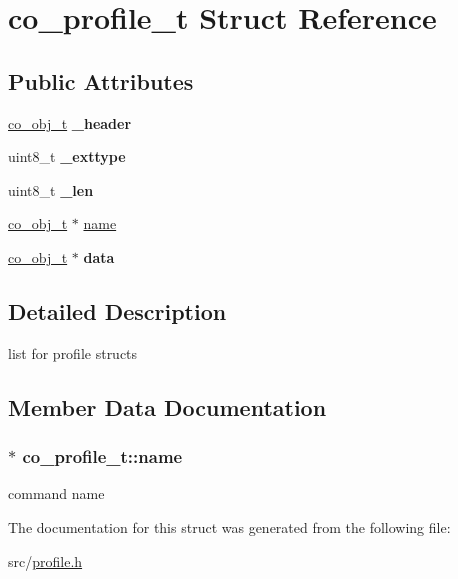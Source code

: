 \hypertarget{structco__profile__t}{\section{co\-\_\-profile\-\_\-t Struct Reference}
\label{structco__profile__t}
}
\subsection*{Public Attributes}
\begin{DoxyCompactItemize}
\item 
\hypertarget{structco__profile__t_a54173fb6eaad645f5eb5c2388aeafb70}{\hyperlink{structco__obj__t}{co\-\_\-obj\-\_\-t} {\bfseries \-\_\-header}}\label{structco__profile__t_a54173fb6eaad645f5eb5c2388aeafb70}

\item 
\hypertarget{structco__profile__t_acf749a11bc61f837586be5b493385b0d}{uint8\-\_\-t {\bfseries \-\_\-exttype}}\label{structco__profile__t_acf749a11bc61f837586be5b493385b0d}

\item 
\hypertarget{structco__profile__t_a84137c8167867e38b8b775a9fed599e8}{uint8\-\_\-t {\bfseries \-\_\-len}}\label{structco__profile__t_a84137c8167867e38b8b775a9fed599e8}

\item 
\hyperlink{structco__obj__t}{co\-\_\-obj\-\_\-t} $\ast$ \hyperlink{structco__profile__t_ab13ad349b42cf5d5a7e1f44f783130cc}{name}
\item 
\hypertarget{structco__profile__t_a5a256293b7d272d8f257c065f004ff61}{\hyperlink{structco__obj__t}{co\-\_\-obj\-\_\-t} $\ast$ {\bfseries data}}\label{structco__profile__t_a5a256293b7d272d8f257c065f004ff61}

\end{DoxyCompactItemize}


\subsection{Detailed Description}
list for profile structs 

\subsection{Member Data Documentation}
\hypertarget{structco__profile__t_ab13ad349b42cf5d5a7e1f44f783130cc}{
\subsubsection[{name}]{$\ast$ co\-\_\-profile\-\_\-t\-::name}}\label{structco__profile__t_ab13ad349b42cf5d5a7e1f44f783130cc}
command name 

The documentation for this struct was generated from the following file\-:\begin{DoxyCompactItemize}
\item 
src/\hyperlink{profile_8h}{profile.\-h}\end{DoxyCompactItemize}
